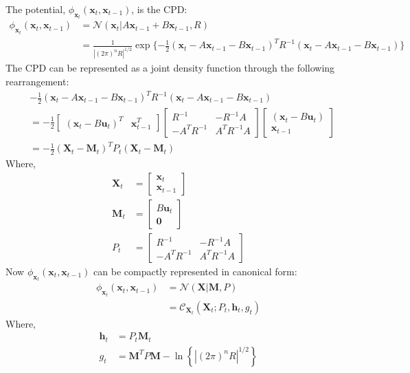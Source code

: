 The potential, $\phi_{\pmb{x}_t} (\pmb{x}_{t}, \pmb{x}_{t-1})$, is the CPD:
\begin{align}
\phi_{\pmb{x}_t} (\pmb{x}_{t}, \pmb{x}_{t-1}) &= \mathcal{N}\left(\pmb{x}_{t} | A \pmb{x}_{t-1} + B \pmb{x}_{t-1}, R \right) \nonumber \\
 &= \frac{1}{ | (2 \pi)^{n} R |^{1/2} } \exp{ \{ -\frac{1}{2} \left( \pmb{x}_{t} - A \pmb{x}_{t-1} - B \pmb{x}_{t-1} \right)^{T} R^{-1} \left( \pmb{x}_{t} - A \pmb{x}_{t-1} - B \pmb{x}_{t-1} \right)\} }
\end{align}
The CPD can be represented as a joint density function through the following rearrangement:
\begin{align}
& -\frac{1}{2} \left( \pmb{x}_{t} - A \pmb{x}_{t-1} - B \pmb{x}_{t-1} \right)^{T} R^{-1} \left( \pmb{x}_{t} - A \pmb{x}_{t-1} - B \pmb{x}_{t-1} \right) \nonumber \\
&= -\frac{1}{2} \begin{bmatrix} \left( \pmb{x}_{t} - B \pmb{u}_{t} \right)^{T} & \pmb{x}_{t-1}^{T} \end{bmatrix} \begin{bmatrix} R^{-1} & -R^{-1} A \\ -A^{T} R^{-1} & A^{T} R^{-1} A \end{bmatrix} \begin{bmatrix} \left( \pmb{x}_{t} - B \pmb{u}_{t} \right) \\ \pmb{x}_{t-1} \end{bmatrix} \nonumber \\
&= -\frac{1}{2} \left( \pmb{X}_{t} - \pmb{M}_t \right)^{T} P_t \left( \pmb{X}_{t} - \pmb{M}_t \right) 
\end{align}
Where,
\begin{align}
\pmb{X}_{t} &= \begin{bmatrix} \pmb{x}_t \\ \pmb{x}_{t-1} \end{bmatrix} \\
\pmb{M}_t &= \begin{bmatrix} B\pmb{u}_t \\ \pmb{0} \end{bmatrix} \\
P_t &= \begin{bmatrix} R^{-1} & -R^{-1} A \\ -A^{T} R^{-1} & A^{T} R^{-1} A \end{bmatrix}
\end{align}
Now $\phi_{\pmb{x}_t} (\pmb{x}_{t}, \pmb{x}_{t-1})$ can be compactly represented in canonical form:
\begin{align}
\phi_{\pmb{x}_t} (\pmb{x}_{t}, \pmb{x}_{t-1}) &= \mathcal{N}\left( \pmb{X} | \pmb{M}, P \right) \nonumber \\
&= \mathcal{C}_{\pmb{X}_t} \left( \pmb{X}_t ; P_t, \pmb{h}_{t}, g_{t} \right)
\end{align}
Where, 
\begin{align}
\pmb{h}_{t} &= P_{t} \pmb{M}_{t} \\
g_{t} &= \pmb{M}^{T} P \pmb{M} - \ln{ \left\{ | (2 \pi)^{n} R |^{1/2} \right\} }
\end{align}

